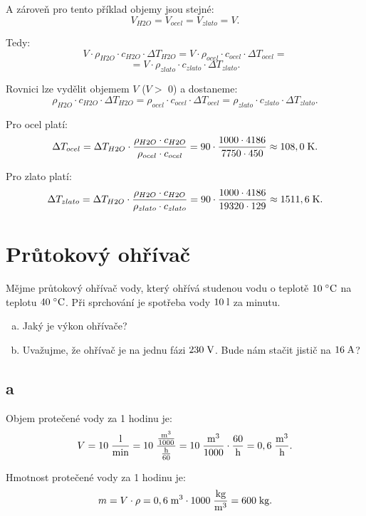\documentclass{article}
\begin{document}
A zároveň pro tento příklad objemy jsou stejné:
$$
    V_{H2O} = V_{ocel} = V_{zlato} = V.
$$

Tedy:
$$
    V \cdot \rho_{H2O} \cdot c_{H2O} \cdot \Delta T_{H2O} = V \cdot \rho_{ocel} \cdot c_{ocel} \cdot \Delta T_{ocel} =
$$
$$
    =  V \cdot \rho_{zlato} \cdot c_{zlato} \cdot \Delta T_{zlato}.
$$

Rovnici lze vydělit objemem $V$ ($V >$ 0) a dostaneme:
$$
    \rho_{H2O} \cdot c_{H2O} \cdot \Delta T_{H2O} = \rho_{ocel} \cdot c_{ocel} \cdot \Delta T_{ocel} = \rho_{zlato} \cdot c_{zlato} \cdot \Delta T_{zlato}.
$$

Pro ocel platí:
$$
    \Delta T_{ocel} = \Delta T_{H2O} \cdot \frac{\rho_{H2O} \cdot c_{H2O}}{\rho_{ocel} \cdot c_{ocel}} = 90 \cdot \frac{1 000 \cdot 4 186}{7 750 \cdot 450} \approx 108,0 \; \textrm{K}.
$$

Pro zlato platí:
$$
    \Delta T_{zlato} = \Delta T_{H2O} \cdot \frac{\rho_{H2O} \cdot c_{H2O}}{\rho_{zlato} \cdot c_{zlato}} = 90 \cdot \frac{1 000 \cdot 4 186}{19 320 \cdot 129} \approx 1511,6 \; \textrm{K}.
$$

\newpage



\section{ Průtokový ohřívač \spicy}
Mějme průtokový ohřívač vody, který ohřívá studenou vodu o teplotě $10 \; ^\circ \textrm{C}$ \fs na teplotu $40 \; ^\circ \textrm{C}$. Při sprchování je spotřeba vody $10 \; \textrm{l}$ za minutu.

\begin{enumerate}[a)]
    \item Jaký je výkon ohřívače?
    \item Uvažujme, že ohřívač je na jednu fázi $230 \; \textrm{V}$. Bude nám stačit jistič na $16 \; \textrm{A}$?
\end{enumerate}


\subsection{a}

Objem protečené vody za 1 hodinu je:
$$
    V = 10 \; \frac{\textrm{l}}{\textrm{min}} = 10 \; \frac{\frac{\textrm{m}^{\textrm{3}}}{1000}}{\frac{\textrm{h}}{60}} = 10 \; \frac{\textrm{m}^{\textrm{3}}}{1000} \cdot \frac{60}{\textrm{h}} = 0,6 \; \frac{\textrm{m}^{\textrm{3}}}{\textrm{h}}.
$$

Hmotnost protečené vody za 1 hodinu je:
$$
    m = V \cdot \rho = 0,6 \; \textrm{m}^{\textrm{3}} \cdot 1 000 \; \frac{\textrm{kg}}{\textrm{m}^{\textrm{3}}} = 600 \; \textrm{kg}.
$$
\end{document}
